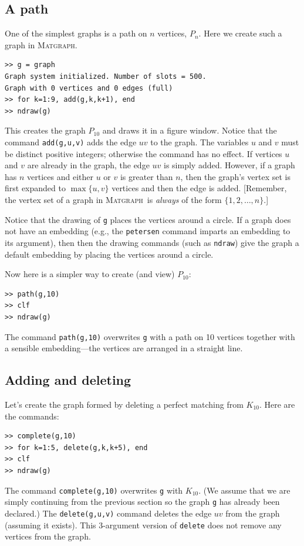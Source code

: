 \documentclass[12pt]{amsart}
\newcommand\matgraph{\textsc{Matgraph}}
\begin{document}
\subsection{A path} One of the simplest graphs is a path on $n$
vertices, $P_n$. Here we create such a graph in \matgraph.
\begin{verbatim}
>> g = graph
Graph system initialized. Number of slots = 500.
Graph with 0 vertices and 0 edges (full)
>> for k=1:9, add(g,k,k+1), end
>> ndraw(g)
\end{verbatim}
This creates the graph $P_{10}$ and draws it in a figure window.
Notice that the command \verb|add(g,u,v)| adds the edge $uv$ to the
graph. The variables $u$ and $v$ must be distinct positive integers;
otherwise the command has no effect. If vertices $u$ and $v$ are
already in the graph, the edge $uv$ is simply added. However, if a
graph has $n$ vertices and either $u$ or $v$ is greater than $n$, then
the graph's vertex set is first expanded to $\max\{u,v\}$ vertices and
then the edge is added. [Remember, the vertex set of a graph in
\matgraph\ is \emph{always} of the form $\{1,2,\ldots,n\}$.]

Notice that the drawing of \verb|g| places the vertices around a
circle. If a graph does not have an embedding (e.g., the
\verb|petersen| command imparts an embedding to its argument), then
then the drawing commands (such as \verb|ndraw|) give the graph a
default embedding by placing the vertices around a circle. 

Now here is a simpler way to create (and view) $P_{10}$:
\begin{verbatim}
>> path(g,10)
>> clf
>> ndraw(g)
\end{verbatim}
The command \verb|path(g,10)| overwrites \verb|g| with a path on 10
vertices together with a sensible embedding---the vertices are
arranged in a straight line. 

\subsection{Adding and deleting} 
Let's create the graph formed by deleting a perfect matching from
$K_{10}$. Here are the commands:
\begin{verbatim}
>> complete(g,10)
>> for k=1:5, delete(g,k,k+5), end
>> clf
>> ndraw(g)
\end{verbatim}
The command \verb|complete(g,10)| overwrites \verb|g| with $K_{10}$. (We
assume that we are simply continuing from the previous section so the
graph \verb|g| has already been declared.) The \verb|delete(g,u,v)|
command deletes the edge $uv$ from the graph (assuming it exists).
This 3-argument version of \verb|delete| does not remove any vertices
from the graph.
\end{document}
